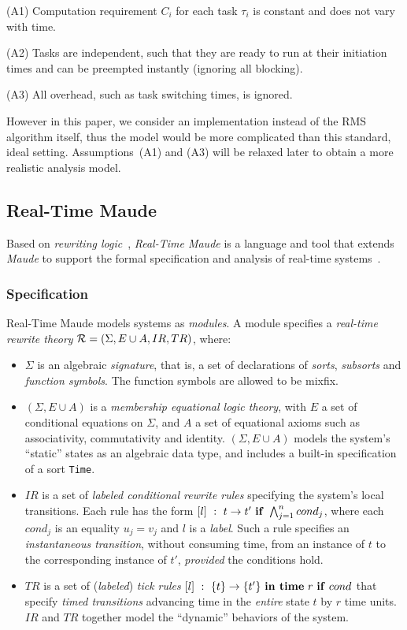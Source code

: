 \documentclass{llncs}
\begin{document}
(A1) Computation requirement $C_i$ for each task $\tau_i$ is constant
and does not vary with time.

(A2) Tasks are independent, such that they are ready to run at their
initiation times and can be preempted instantly (ignoring all
blocking).

(A3) All overhead, such as task switching times, is ignored.

However in this paper, we consider an implementation instead of the
RMS algorithm itself, thus the model would be more complicated than
this standard, ideal setting.  Assumptions~(A1) and (A3) will be
relaxed later to obtain a more realistic analysis model.

\subsection{Real-Time Maude}
Based on \emph{rewriting logic}~\cite{DBLP:journals/jlp/Meseguer12},
\emph{Real-Time Maude} is a language and tool that extends
\emph{Maude} to support the formal specification and analysis of
real-time systems~\cite{DBLP:journals/lisp/OlveczkyM07}.

\subsubsection{Specification}
Real-Time Maude models systems as \emph{modules}. A module specifies a
\emph{real-time rewrite theory} ${\cal R} = (\Sigma, E\cup A , IR,
TR)$, where:
\begin{itemize}
\item $\Sigma$ is an algebraic \emph{signature}, that is, a set of
  declarations of \emph{sorts}, \emph{subsorts} and \emph{function
    symbols}. The function symbols are allowed to be mixfix.
\item $(\Sigma, E\cup A)$ is a \emph{membership equational logic
  theory}, with $E$ a set of conditional equations on $\Sigma$, and
  $A$ a set of equational axioms such as associativity, commutativity
  and identity.  $(\Sigma, E\cup A)$ models the system's ``static''
  states as an algebraic data type, and includes a built-in
  specification of a sort \verb|Time|.
\item $IR$ is a set of \emph{labeled conditional rewrite rules}
  specifying the system's local transitions. Each rule has the form
  $[l]~:~t\rightarrow t'\mbox{ \textbf{if} }\bigwedge^n_{j=1}cond_j$,
  where each $cond_j$ is an equality $u_j=v_j$ and $l$ is a
  \emph{label}. Such a rule specifies an \emph{instantaneous
    transition}, without consuming time, from an instance of $t$ to
  the corresponding instance of $t'$, \emph{provided} the conditions
  hold.
\item $TR$ is a set of (\emph{labeled}) \emph{tick rules}
  $[l]~:~\{t\}\rightarrow\{t'\} \mbox{ \textbf{in time} }r\mbox{
  \textbf{if} }cond$ that specify \emph{timed transitions} advancing
  time in the \emph{entire} state $t$ by $r$ time units. $IR$ and $TR$
  together model the ``dynamic'' behaviors of the system.
\end{itemize}
\end{document}
